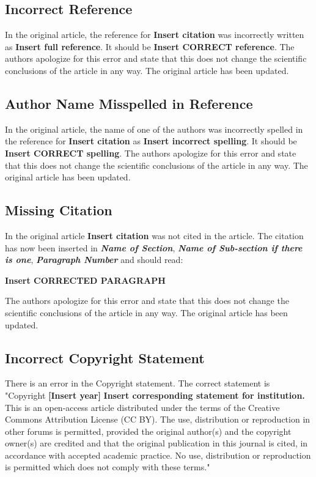 \documentclass[utf8]{frontiers_correction}
\begin{document}
\subsection*{Incorrect Reference}
In the original article, the reference for \textbf{Insert citation} was incorrectly written as \textbf{Insert full reference}. It should be \textbf{Insert CORRECT reference}. The authors apologize for this error and state that this does not change the scientific conclusions of the article in any way. The original article has been updated.

\subsection*{Author Name Misspelled in Reference}
In the original article, the name of one of the authors was incorrectly spelled in the reference for \textbf{Insert citation} as \textbf{Insert incorrect spelling}. It should be \textbf{Insert CORRECT spelling}. The authors apologize for this error and state that this does not change the scientific conclusions of the article in any way. The original article has been updated.

\subsection*{Missing Citation}
In the original article \textbf{Insert citation} was not cited in the article. The citation has now been inserted in \textbf{\textit{Name of Section}}, \textbf{\textit{Name of Sub-section if there is one}}, \textbf{\textit{Paragraph Number}} and should read:\par

\textbf{Insert CORRECTED PARAGRAPH}\par %

The authors apologize for this error and state that this does not change the scientific conclusions of the article in any way. The original article has been updated.

\subsection*{Incorrect Copyright Statement}

There is an error in the Copyright statement. The correct statement is "Copyright \textcopyright \textbf{[Insert year]} \textbf{Insert corresponding statement for institution.} This is an open-access article distributed under the terms of the Creative Commons Attribution License (CC BY). The use, distribution or reproduction in other forums is permitted, provided the original author(s) and the copyright owner(s) are credited and that the original publication in this journal is cited, in accordance with accepted academic practice. No use, distribution or reproduction is permitted which does not comply with these terms." 
\end{document}
